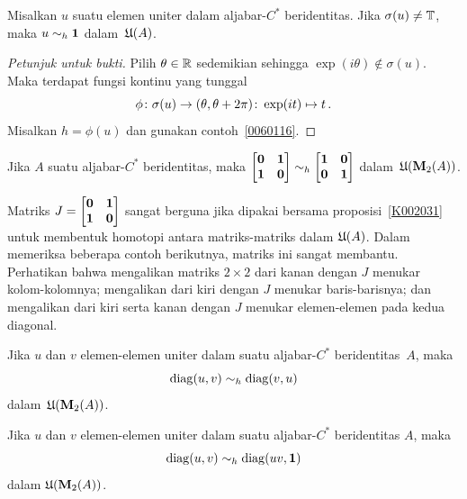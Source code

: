 \begin{prop}\label{0060121} Misalkan $u$ suatu elemen uniter dalam aljabar-$C^*$ beridentitas. Jika $\sigma(u) \ne \mathbb{T}$, maka $u \sim_h \mathbf{1}$ dalam~$\mathfrak{U}(A)$.
\end{prop}

\begin{proof}[\emph{Petunjuk untuk bukti}] Pilih $\theta \in \mathbb{R}$ sedemikian sehingga $\exp(i\theta) \notin \sigma(u)$. Maka terdapat fungsi kontinu yang tunggal
   \[ \phi\colon \sigma(u) \rightarrow (\theta, \theta + 2\pi)\colon \exp(it) \mapsto t\,. \]
Misalkan $h = \phi(u)$ dan gunakan contoh~\ref{0060116}.   \ns
\end{proof}

\begin{exam}\label{0060129a} Jika $A$ suatu aljabar-$C^*$ beridentitas, maka $\begin{bmatrix} \mathbf{0}  &  \mathbf{1}  \\  \mathbf{1}  &  \mathbf{0}  \end{bmatrix} \sim_h
\begin{bmatrix} \mathbf{1}  &  \mathbf{0}  \\ \mathbf{0}  & \mathbf{1} \end{bmatrix}$ dalam~$\mathfrak{U}(\mathbf{M}_{2}({A}))$.
\end{exam}

Matriks $J = \begin{bmatrix} \mathbf{0}  &  \mathbf{1}  \\ \mathbf{1} & \mathbf{0} \end{bmatrix}$ sangat berguna jika dipakai bersama
proposisi~\ref{K002031} untuk membentuk homotopi antara matriks-matriks dalam $\mathfrak{U}(A)$. Dalam memeriksa beberapa contoh
berikutnya, matriks ini sangat membantu. Perhatikan bahwa mengalikan matriks $2 \times 2$ dari kanan dengan $J$ menukar kolom-kolomnya; mengalikan
dari kiri dengan $J$ menukar baris-barisnya; dan mengalikan dari kiri serta kanan dengan $J$ menukar elemen-elemen pada kedua diagonal.

\begin{exam}\label{0060129b} Jika $u$ dan $v$ elemen-elemen uniter dalam suatu aljabar-$C^*$ beridentitas~$A$, maka
   \[ \operatorname{diag}(u,v) \sim_h \operatorname{diag}(v,u) \]
dalam~$\mathfrak{U}(\mathbf{M}_{2}({A}))$.
\end{exam}

\begin{exam}\label{0060129c} Jika $u$ dan $v$ elemen-elemen uniter dalam suatu aljabar-$C^*$ beridentitas $A$, maka
  \[ \operatorname{diag}(u,v) \sim_h \operatorname{diag}(uv, \mathbf{1}) \]
dalam $\mathfrak{U}(\mathbf{M}_{2}({A}))$.
\end{exam}

